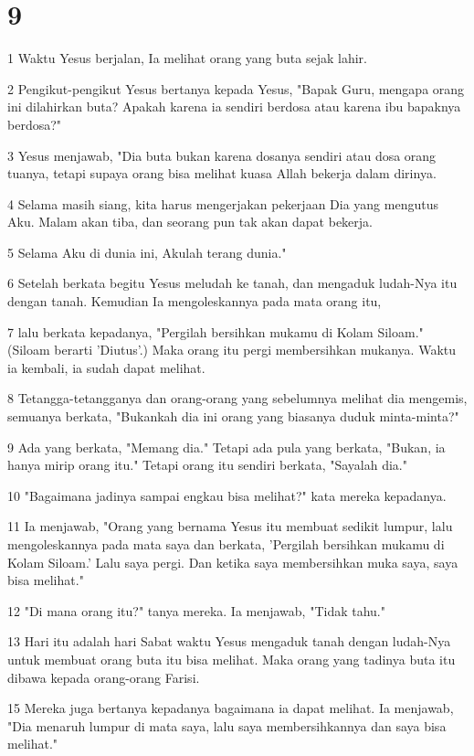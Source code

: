 \chapter{9}

\par 1 Waktu Yesus berjalan, Ia melihat orang yang buta sejak lahir.
\par 2 Pengikut-pengikut Yesus bertanya kepada Yesus, "Bapak Guru, mengapa orang ini dilahirkan buta? Apakah karena ia sendiri berdosa atau karena ibu bapaknya berdosa?"
\par 3 Yesus menjawab, "Dia buta bukan karena dosanya sendiri atau dosa orang tuanya, tetapi supaya orang bisa melihat kuasa Allah bekerja dalam dirinya.
\par 4 Selama masih siang, kita harus mengerjakan pekerjaan Dia yang mengutus Aku. Malam akan tiba, dan seorang pun tak akan dapat bekerja.
\par 5 Selama Aku di dunia ini, Akulah terang dunia."
\par 6 Setelah berkata begitu Yesus meludah ke tanah, dan mengaduk ludah-Nya itu dengan tanah. Kemudian Ia mengoleskannya pada mata orang itu,
\par 7 lalu berkata kepadanya, "Pergilah bersihkan mukamu di Kolam Siloam." (Siloam berarti 'Diutus'.) Maka orang itu pergi membersihkan mukanya. Waktu ia kembali, ia sudah dapat melihat.
\par 8 Tetangga-tetangganya dan orang-orang yang sebelumnya melihat dia mengemis, semuanya berkata, "Bukankah dia ini orang yang biasanya duduk minta-minta?"
\par 9 Ada yang berkata, "Memang dia." Tetapi ada pula yang berkata, "Bukan, ia hanya mirip orang itu." Tetapi orang itu sendiri berkata, "Sayalah dia."
\par 10 "Bagaimana jadinya sampai engkau bisa melihat?" kata mereka kepadanya.
\par 11 Ia menjawab, "Orang yang bernama Yesus itu membuat sedikit lumpur, lalu mengoleskannya pada mata saya dan berkata, 'Pergilah bersihkan mukamu di Kolam Siloam.' Lalu saya pergi. Dan ketika saya membersihkan muka saya, saya bisa melihat."
\par 12 "Di mana orang itu?" tanya mereka. Ia menjawab, "Tidak tahu."
\par 13 Hari itu adalah hari Sabat waktu Yesus mengaduk tanah dengan ludah-Nya untuk membuat orang buta itu bisa melihat. Maka orang yang tadinya buta itu dibawa kepada orang-orang Farisi.
\par 15 Mereka juga bertanya kepadanya bagaimana ia dapat melihat. Ia menjawab, "Dia menaruh lumpur di mata saya, lalu saya membersihkannya dan saya bisa melihat."
